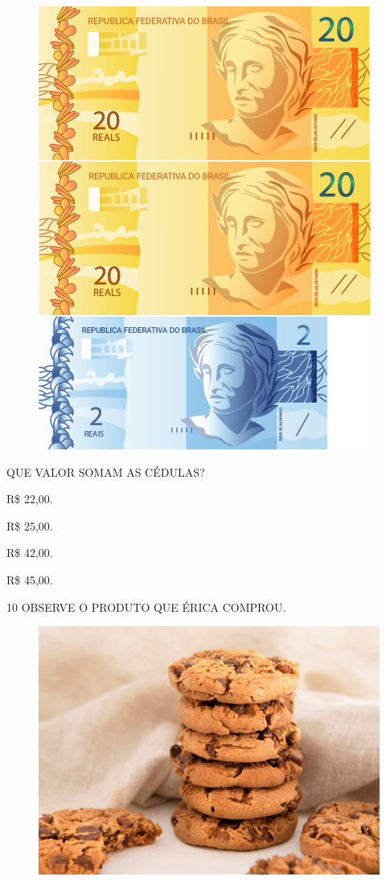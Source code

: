 \begin{figure}[H]
\centering
\includegraphics[width=.5\textwidth]{./media/SAEB_1ANO_MAT_FIGURA117b.png}
\end{figure}

QUE VALOR SOMAM AS CÉDULAS?

\begin{escolha}
\item R\$ 22,00.

\item R\$ 25,00.

\item R\$ 42,00.

\item R\$ 45,00.
\end{escolha}

\num{10} OBSERVE O PRODUTO QUE ÉRICA COMPROU.

\begin{figure}[H]
\includegraphics[width=\textwidth]{media/image116.png}
\end{figure}

